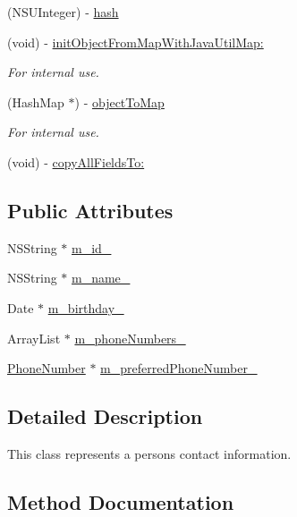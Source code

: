 \begin{DoxyCompactItemize}
(N\+S\+U\+Integer) -\/ \hyperlink{interface_contact_info_a76805e61b71f7bef1b652fa2adae5540}{hash}
\item 
(void) -\/ \hyperlink{interface_contact_info_ab7529beb16604cdcfc6218ef0ce3614d}{init\+Object\+From\+Map\+With\+Java\+Util\+Map\+:}
\begin{DoxyCompactList}\small\item\em For internal use. \end{DoxyCompactList}\item 
(Hash\+Map $\ast$) -\/ \hyperlink{interface_contact_info_a4fada730efb17fa23bd87271c46659e6}{object\+To\+Map}
\begin{DoxyCompactList}\small\item\em For internal use. \end{DoxyCompactList}\item 
(void) -\/ \hyperlink{interface_contact_info_a5631628efe2c0dae84dff49e6c507d5d}{copy\+All\+Fields\+To\+:}
\end{DoxyCompactItemize}
\subsection*{Public Attributes}
\begin{DoxyCompactItemize}
\item 
N\+S\+String $\ast$ \hyperlink{interface_contact_info_a40d0e1360de3473fdd1334fe34c99f63}{m\+\_\+id\+\_\+}
\item 
N\+S\+String $\ast$ \hyperlink{interface_contact_info_af22bda997f3412dc374c4e49e8ef1f5b}{m\+\_\+name\+\_\+}
\item 
Date $\ast$ \hyperlink{interface_contact_info_a28569ebc5e7c0b06d3b0479ebf46cb39}{m\+\_\+birthday\+\_\+}
\item 
Array\+List $\ast$ \hyperlink{interface_contact_info_a6445dc57a7d77146ce1df8638c591068}{m\+\_\+phone\+Numbers\+\_\+}
\item 
\hyperlink{interface_phone_number}{Phone\+Number} $\ast$ \hyperlink{interface_contact_info_a5d96317ffff5e452c9a2c6aa167df54b}{m\+\_\+preferred\+Phone\+Number\+\_\+}
\end{DoxyCompactItemize}


\subsection{Detailed Description}
This class represents a person\textquotesingle{}s contact information. 

\subsection{Method Documentation}
\hypertarget{interface_contact_info_ae94da2f6b9f53e9321d5060829d6fbab}{}
